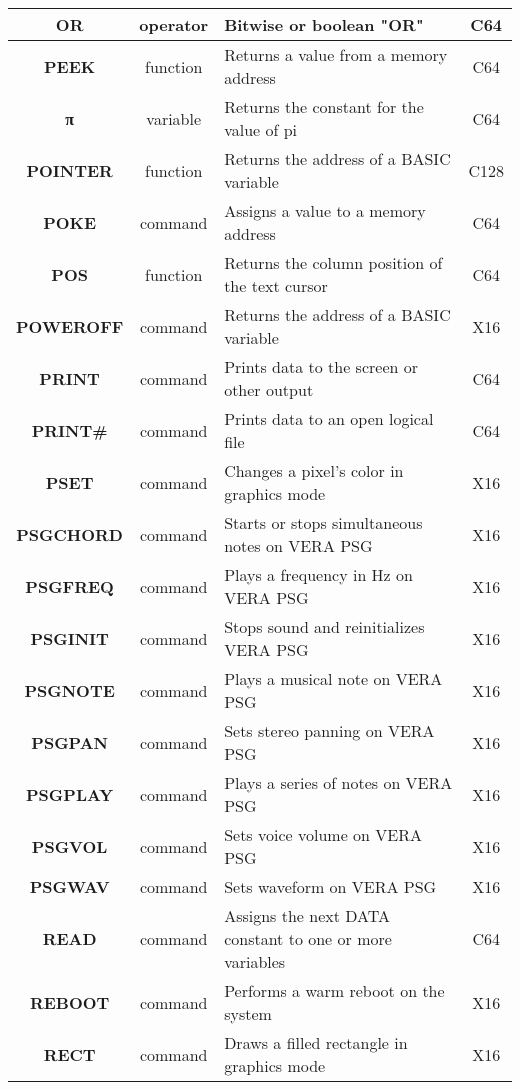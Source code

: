 \begin{longtable}{|c|c|m{4cm}|c|}
	{\bfseries OR} & operator & Bitwise or boolean "OR" & C64 \\ \hline
	{\bfseries PEEK} & function & Returns a value from a memory address & C64 \\ \hline
	{\ttfamily\bfseries π} & variable & Returns the constant for the value of pi & C64 \\ \hline
	{\bfseries POINTER} & function & Returns the address of a BASIC variable & C128 \\ \hline
	{\bfseries POKE} & command & Assigns a value to a memory address & C64 \\ \hline
	{\bfseries POS} & function & Returns the column position of the text cursor & C64 \\ \hline
	{\bfseries POWEROFF} & command & Returns the address of a BASIC variable & X16 \\ \hline
	{\bfseries PRINT} & command & Prints data to the screen or other output & C64 \\ \hline
	{\bfseries PRINT\#} & command & Prints data to an open logical file & C64 \\ \hline
	{\bfseries PSET} & command & Changes a pixel's color in graphics mode & X16 \\ \hline
	{\bfseries PSGCHORD} & command & Starts or stops simultaneous notes on VERA PSG & X16 \\ \hline
	{\bfseries PSGFREQ} & command & Plays a frequency in Hz on VERA PSG & X16 \\ \hline
	{\bfseries PSGINIT} & command & Stops sound and reinitializes VERA PSG & X16 \\ \hline
	{\bfseries PSGNOTE} & command & Plays a musical note on VERA PSG & X16 \\ \hline
	{\bfseries PSGPAN} & command & Sets stereo panning on VERA PSG & X16 \\ \hline
	{\bfseries PSGPLAY} & command & Plays a series of notes on VERA PSG & X16 \\ \hline
	{\bfseries PSGVOL} & command & Sets voice volume on VERA PSG & X16 \\ \hline
	{\bfseries PSGWAV} & command & Sets waveform on VERA PSG & X16 \\ \hline
	{\bfseries READ} & command & Assigns the next {\ttfamily DATA} constant to one or more variables & C64 \\ \hline
	{\bfseries REBOOT} & command & Performs a warm reboot on the system & X16 \\ \hline
	{\bfseries RECT} & command & Draws a filled rectangle in graphics mode & X16 \\ \hline

\end{longtable}
